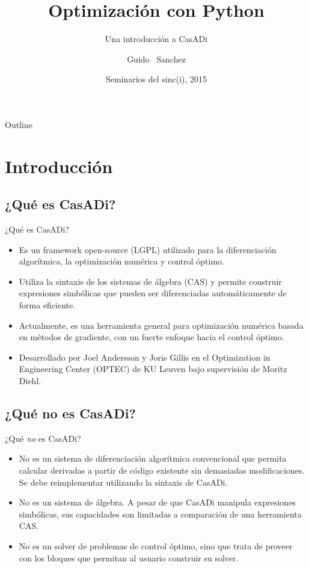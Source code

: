 \documentclass{beamer}
\title{Optimización con Python}
\subtitle{Una introducción a CasADi}
\author{Guido ~Sanchez}
\institute[sinc(i)] %
{
  Centro de Investigación en Señales, Sistemas e Inteligencia Computacional \\
  Universidad Nacional del Litoral
}
\date{Seminarios del sinc(i), 2015}
\begin{document}
\begin{frame}
  \titlepage
\end{frame}

\begin{frame}{Outline}
  \tableofcontents
\end{frame}


\section{Introducción}

\subsection{¿Qué es CasADi?}

\begin{frame}{¿Qué es CasADi?}{}
  \begin{itemize}
  \item Es un framework open-source (LGPL) utilizado para la diferenciación algorítmica, la optimización numérica y control óptimo.
  \item Utiliza la sintaxis de los sistemas de álgebra (CAS) y permite construir expresiones simbólicas que pueden ser diferenciadas automáticamente de forma eficiente.
  \item Actualmente, es una herramienta general para optimización numérica basada en métodos de gradiente, con un fuerte enfoque hacia el control óptimo.
  \item Desarrollado por Joel Andersson y Joris Gillis en el Optimization in Engineering Center (OPTEC) de KU Leuven bajo supervisión de Moritz Diehl.
  \end{itemize}
\end{frame}

\subsection{¿Qué no es CasADi?}

\begin{frame}{¿Qué \textit{no} es CasADi?}
  \begin{itemize}
  \item No es un sistema de diferenciación algorítmica convencional que permita calcular derivadas a partir de código existente sin demasiadas modificaciones. Se debe reimplementar utilizando la sintaxis de CasADi.
  \item No es un sistema de álgebra. A pesar de que CasADi manipula expresiones simbólicas, sus capacidades son limitadas a comparación de una herramienta CAS.
  \item No es un solver de problemas de control óptimo, sino que trata de proveer con los bloques que permitan al usuario construir su solver.
  \end{itemize}
\end{frame}
\end{document}
